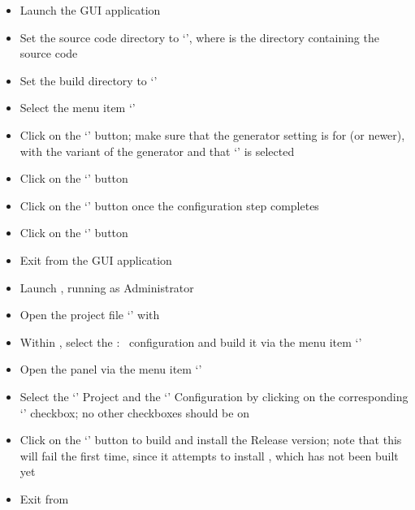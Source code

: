 \begin{itemize}
\item Launch the  GUI application
\item\exSp{}Set the source code directory to
`', where 
is the directory containing the \mplusm{} source code
\item\exSp{}Set the build directory to
`'
\item\exSp{}Select the menu item `'
\item\exSp{}Click on the `' button; make sure that the generator
setting is for  (or newer), with the  variant of
the generator and that `'
is selected
\item\exSp{}Click on the `' button
\item\exSp{}Click on the `' button once the configuration step
completes
\item\exSp{}Click on the `' button
\item\exSp{}Exit from the  GUI application
\item\exSp{}Launch , running as Administrator
\item\exSp{}Open the project file
`' with
\item\exSp{}Within , select the  :\ 
configuration and build it via the menu item
`'
\item\exSp{}Open the  panel via the menu item
`'
\item\exSp{}Select the `' Project and the `'
Configuration by clicking on the corresponding `' checkbox; no other
checkboxes should be on
\item\exSp{}Click on the `' button to build and install the Release
version; note that this will fail the first time, since it attempts to install
\textit{\MMMU}, which has not been built yet
\item\exSp{}Exit from 
\end{itemize}
